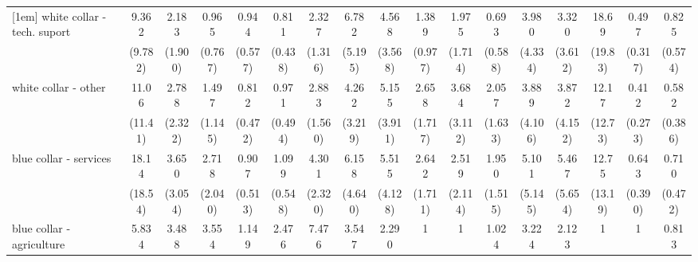 {\begin{tabular}{l*{16}{c}}
[1em]
white collar - tech. suport&       9.362\sym{*}  &       2.183         &       0.965         &       0.944         &       0.811         &       2.327         &       6.782\sym{*}  &       4.568         &       1.389         &       1.975         &       0.693         &       3.980         &       3.320         &       18.69\sym{**} &       0.497         &       0.825         \\
                    &     (9.782)         &     (1.900)         &     (0.767)         &     (0.577)         &     (0.438)         &     (1.316)         &     (5.195)         &     (3.568)         &     (0.977)         &     (1.714)         &     (0.588)         &     (4.334)         &     (3.612)         &     (19.83)         &     (0.317)         &     (0.574)         \\
[1em]
white collar - other&       11.06\sym{*}  &       2.788         &       1.497         &       0.812         &       0.971         &       2.883         &       4.262         &       5.155\sym{*}  &       2.658         &       3.684         &       2.057         &       3.889         &       3.872         &       12.17\sym{*}  &       0.412         &       0.582         \\
                    &     (11.41)         &     (2.322)         &     (1.145)         &     (0.472)         &     (0.494)         &     (1.560)         &     (3.219)         &     (3.911)         &     (1.717)         &     (3.112)         &     (1.633)         &     (4.106)         &     (4.152)         &     (12.73)         &     (0.273)         &     (0.386)         \\
[1em]
blue collar - services&       18.14\sym{**} &       3.650         &       2.718         &       0.907         &       1.099         &       4.301\sym{**} &       6.158\sym{*}  &       5.515\sym{*}  &       2.642         &       2.519         &       1.950         &       5.101         &       5.467         &       12.75\sym{*}  &       0.643         &       0.710         \\
                    &     (18.54)         &     (3.054)         &     (2.040)         &     (0.513)         &     (0.548)         &     (2.320)         &     (4.640)         &     (4.128)         &     (1.711)         &     (2.114)         &     (1.515)         &     (5.145)         &     (5.654)         &     (13.19)         &     (0.390)         &     (0.472)         \\
[1em]
blue collar - agriculture&       5.834         &       3.488         &       3.554         &       1.149         &       2.476         &       7.476\sym{**} &       3.547         &       2.290         &           1         &           1         &       1.024         &       3.224         &       2.123         &           1         &           1         &       0.813         \\

\end{tabular}}
